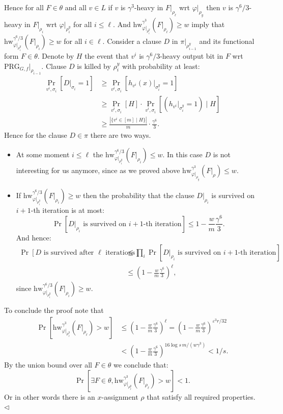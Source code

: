 Hence for all $F\in\theta$ and all $v\in L$ if $v$ is $\gamma^3$-heavy in $F|_{\rho_\ell}$ wrt $\varphi|_{\rho_y}$ then $v$ is $\gamma^6/3$-heavy in $F|_{\rho_i}$ wrt $\varphi|_{\rho_i^y}$ for all $i\leq\ell$. And $\mathrm{hw}_{\varphi|_{\rho_i^y}}^{\gamma^3}(F|_{\rho_\ell})\geq w$ imply that $\mathrm{hw}_{\varphi|_{\rho_i^y}}^{\gamma^6/3}(F|_{\rho_i})\geq w$ for all $i\in\ell$.
Consider a clause $D$ in $\pi|_{\rho_{i-1}^y}$ and its functional form $F\in\theta$. Denote by $H$ the event that $v^i$ is $\gamma^6/3$-heavy output bit in $F$ wrt $\mathrm{PRG}_{G,f}|_{\rho_{i-1}}$. Clause $D$ is killed by $\rho_i^y$ with probability at least:
\begin{align*}
\Pr_{v^i,\sigma_i}[D|_{\sigma_i}=1]&\geq\Pr_{v^i,\sigma_i}[h_{v^i}(x)|_{\sigma_i^y}=1]\\
&\geq\Pr_{v^i,\sigma_i}[H]\cdot\Pr_{v^i,\sigma_i}[(h_{v^i}|_{\sigma_i^y}=1)\mid H]\\
&\geq\frac{|\{v^i\in[m]\mid H\}|}{m}\cdot\frac{\gamma^6}3.
\end{align*}
Hence for the clause $D\in\pi$ there are two ways.
\begin{itemize}
\item At some moment $i\leq\ell$ the $\mathrm{hw}_{\varphi|_{\rho_i^y}}^{\gamma^6/3}(F|_{\rho_i})\leq w$. In this case $D$ is not interesting for us anymore, since as we proved above $\mathrm{hw}_{\varphi|_{\rho_y}}^{\gamma^3}(F|_\rho)\leq w$.
\item If $\mathrm{hw}_{\varphi|_{\rho_i^y}}^{\gamma^6/3}(F|_{\rho_i})\geq w$ then the probability that the clause $D|_{\rho_i}$ is survived on $i+1$-th iteration is at most:
\[\Pr[D|_{\rho_i}\text{ is survived on }i+1\text{-th iteration}]\leq1-\frac wm\frac{\gamma^6}3.\]
And hence:
\begin{align*}
\Pr[D\text{ is survived after }\ell\text{ iterations}]&\leq\prod_i\Pr[D|_{\rho_i}\text{ is survived on }i+1\text{-th iteration}]\\
&\leq\left(1-\frac wm\frac{\gamma^6}3\right)^\ell,
\end{align*}
since $\mathrm{hw}_{\varphi|_{\rho_i^y}}^{\gamma^6/3}(F|_{\rho_i})\geq w$.
\end{itemize}
To conclude the proof note that
\begin{align*}
\Pr[\mathrm{hw}_{\varphi|_{\rho_\ell^y}}^{\gamma^3}(F|_{\rho_\ell})>w]
&\leq\left(1-\frac wm\frac{\gamma^6}3\right)^\ell=\left(1-\frac wm\frac{\gamma^6}3\right)^{\varepsilon^3r/32}\\
&<\left(1-\frac wm\frac{\gamma^6}3\right)^{16\log s\,m/(w\gamma^3)}<1/s.
\end{align*}
By the union bound over all $F\in\theta$ we conclude that:
\[\Pr[\exists F\in\theta,\mathrm{hw}_{\varphi|_{\rho_\ell^y}}^{\gamma^3}(F|_{\rho_\ell})>w]<1.\]
Or in other words there is an $x$-assignment $\rho$ that satisfy all required properties.\hfill$\triangleleft$
